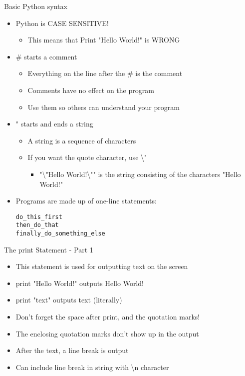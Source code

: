 \begin{frame}[fragile]{Basic Python syntax}
  \begin{itemize}
    \item Python is CASE SENSITIVE!
  \begin{itemize}
    \item This means that {\ttfamily Print "Hello World!"} is WRONG
  \end{itemize}
\item {\ttfamily \#} starts a comment
  \begin{itemize}
    \item Everything on the line after the {\ttfamily \#} is the comment
    \item Comments have no effect on the program
    \item Use them so others can understand your program
  \end{itemize}
\item {\ttfamily "} starts and ends a string
  \begin{itemize}
    \item A string is a sequence of characters
    \item If you want the quote character, use {\ttfamily \textbackslash"}
      \begin{itemize}
        \item {\ttfamily "\textbackslash"Hello World!\textbackslash""}
          is the string consisting of the characters
        {\ttfamily "Hello World!"}
      \end{itemize}
  \end{itemize}
\item Programs are made up of one-line statements:
\begin{lstlisting}
do_this_first
then_do_that
finally_do_something_else
\end{lstlisting}
  \end{itemize}
\end{frame}

\begin{frame}[fragile]{The {\ttfamily print} Statement - Part 1}
  \begin{itemize}
    \item This statement is used for outputting text on the screen
    \item {\ttfamily print "Hello World!"} outputs {\ttfamily Hello World!}
  \item {\ttfamily print "text"} outputs {\ttfamily text} (literally)
  \item Don't forget the space after {\ttfamily print}, and the quotation marks!
  \item The enclosing quotation marks don't show up in the output
  \item After the text, a line break is output
  \item Can include line break in string with {\ttfamily \textbackslash n} character
  \end{itemize}
\end{frame}

